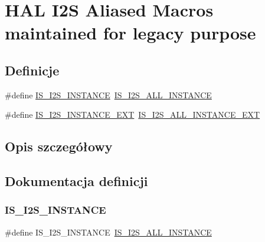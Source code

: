 \hypertarget{group___h_a_l___i2_s___aliased___macros}{}\section{H\+AL I2S Aliased Macros maintained for legacy purpose}
\label{group___h_a_l___i2_s___aliased___macros}
\subsection*{Definicje}
\begin{DoxyCompactItemize}
\item 
\#define \hyperlink{group___h_a_l___i2_s___aliased___macros_ga9d5823981e4ecfd83d532f4189a2c97e}{I\+S\+\_\+\+I2\+S\+\_\+\+I\+N\+S\+T\+A\+N\+CE}~\hyperlink{group___exported__macros_ga0b35685911e3c7a38ee89e5cdc5a82fa}{I\+S\+\_\+\+I2\+S\+\_\+\+A\+L\+L\+\_\+\+I\+N\+S\+T\+A\+N\+CE}
\item 
\#define \hyperlink{group___h_a_l___i2_s___aliased___macros_ga8d97dfabc9313d61306bf5bbd825be6b}{I\+S\+\_\+\+I2\+S\+\_\+\+I\+N\+S\+T\+A\+N\+C\+E\+\_\+\+E\+XT}~\hyperlink{group___exported__macros_ga839b019f23ec240da66dd50a21ab5025}{I\+S\+\_\+\+I2\+S\+\_\+\+A\+L\+L\+\_\+\+I\+N\+S\+T\+A\+N\+C\+E\+\_\+\+E\+XT}
\end{DoxyCompactItemize}


\subsection{Opis szczegółowy}


\subsection{Dokumentacja definicji}
\mbox{\label{group___h_a_l___i2_s___aliased___macros_ga9d5823981e4ecfd83d532f4189a2c97e}} 
\subsubsection{\texorpdfstring{I\+S\+\_\+\+I2\+S\+\_\+\+I\+N\+S\+T\+A\+N\+CE}{IS\_I2S\_INSTANCE}}
{\footnotesize\ttfamily \#define I\+S\+\_\+\+I2\+S\+\_\+\+I\+N\+S\+T\+A\+N\+CE~\hyperlink{group___exported__macros_ga0b35685911e3c7a38ee89e5cdc5a82fa}{I\+S\+\_\+\+I2\+S\+\_\+\+A\+L\+L\+\_\+\+I\+N\+S\+T\+A\+N\+CE}}



